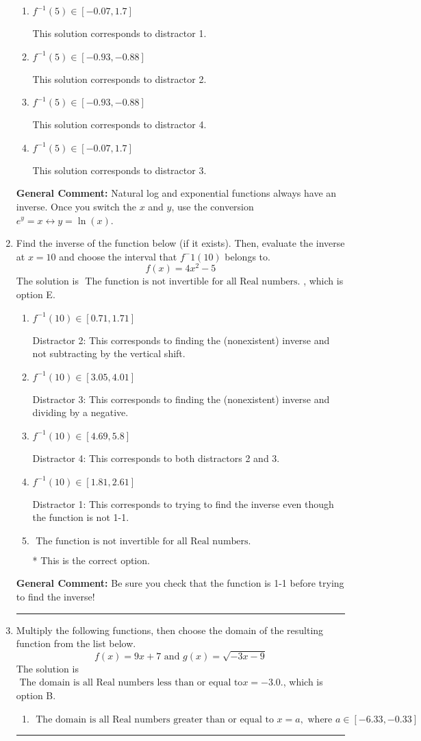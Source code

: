 \documentclass{extbook}[14pt]
\newcommand{\litem}[1]{\item #1

\rule{\textwidth}{0.4pt}}
\begin{document}
\begin{enumerate}
{\begin{enumerate}[label=\Alph*.]
 This is the solution.
\item \( f^{-1}(5) \in [-0.07, 1.7] \)

 This solution corresponds to distractor 1.
\item \( f^{-1}(5) \in [-0.93, -0.88] \)

 This solution corresponds to distractor 2.
\item \( f^{-1}(5) \in [-0.93, -0.88] \)

 This solution corresponds to distractor 4.
\item \( f^{-1}(5) \in [-0.07, 1.7] \)

 This solution corresponds to distractor 3.
\end{enumerate}

\textbf{General Comment:} Natural log and exponential functions always have an inverse. Once you switch the $x$ and $y$, use the conversion $ e^y = x \leftrightarrow y=\ln(x)$.
}
\litem{
Find the inverse of the function below (if it exists). Then, evaluate the inverse at $x = 10$ and choose the interval that $f^-1(10)$ belongs to.
\[ f(x) = 4 x^2 - 5 \]The solution is \( \text{ The function is not invertible for all Real numbers. } \), which is option E.\begin{enumerate}[label=\Alph*.]
\item \( f^{-1}(10) \in [0.71, 1.71] \)

 Distractor 2: This corresponds to finding the (nonexistent) inverse and not subtracting by the vertical shift.
\item \( f^{-1}(10) \in [3.05, 4.01] \)

 Distractor 3: This corresponds to finding the (nonexistent) inverse and dividing by a negative.
\item \( f^{-1}(10) \in [4.69, 5.8] \)

 Distractor 4: This corresponds to both distractors 2 and 3.
\item \( f^{-1}(10) \in [1.81, 2.61] \)

 Distractor 1: This corresponds to trying to find the inverse even though the function is not 1-1. 
\item \( \text{ The function is not invertible for all Real numbers. } \)

* This is the correct option.
\end{enumerate}

\textbf{General Comment:} Be sure you check that the function is 1-1 before trying to find the inverse!
}
\litem{
Multiply the following functions, then choose the domain of the resulting function from the list below.
\[ f(x) = 9x + 7 \text{ and } g(x) = \sqrt{-3x-9}  \]The solution is \( \text{ The domain is all Real numbers less than or equal to} x = -3.0. \), which is option B.\begin{enumerate}[label=\Alph*.]
\item \( \text{ The domain is all Real numbers greater than or equal to } x = a, \text{ where } a \in [-6.33, -0.33] \)



\end{enumerate}}
\end{enumerate}
\end{document}
